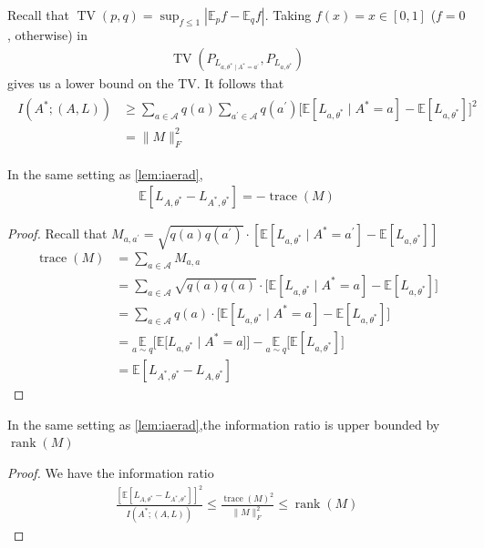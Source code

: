 \documentclass{article}
\begin{document}
Recall that $\operatorname{TV}(p, q)=\sup_{f \leq 1}\left|\mathbb{E}_{p} f-\mathbb{E}_{q} f\right| .$ Taking $f(x)=x\in[0,1]$ ($f=0$, otherwise) in
\begin{align*}
\operatorname{TV}\left(P_{L_{a, \theta^{*} \mid A^{*}=a^{\prime}}}, P_{L_{a, \theta^{*}}}\right)
\end{align*}
gives us a lower bound on the TV. It follows that
\begin{align*}
\begin{aligned}
I\left(A^{*} ;(A, L)\right) & \geq \sum_{a \in \mathcal{A}} q(a) \sum_{a^{\prime} \in \mathcal{A}} q\left(a^{\prime}\right)\bigg[\mathbb{E}\left[L_{a, \theta^{*}} \mid A^{*}=a\right]-\mathbb{E}\left[L_{a, \theta^{*}}\right]\bigg]^{2} \\
&=\|M\|_{F}^{2}
\end{aligned}
\end{align*}

\begin{lema}
  In the same setting as \cref{lem:iaerad},
\begin{align*}
\mathbb{E}\left[L_{A, \theta^{*}}-L_{A^{*}, \theta^{*}}\right]=-\operatorname{trace}(M)
\end{align*}
\end{lema}
\begin{proof}
Recall that $M_{a, a^{\prime}}=\sqrt{q(a) q\left(a^{\prime}\right)} \cdot\left[\mathbb{E}\left[L_{a, \theta^{*}} \mid A^{*}=a^{\prime}\right]-\mathbb{E}\left[L_{a, \theta^{*}}\right]\right]$
\begin{align*}
\operatorname{trace}(M) &=\sum_{a \in \mathcal{A}} M_{a, a} \\
&=\sum_{a \in \mathcal{A}} \sqrt{q(a) q(a)} \cdot\bigg[\mathbb{E}\left[L_{a, \theta^{*}} \mid A^{*}=a\right]-\mathbb{E}\left[L_{a, \theta^{*}}\right]\bigg] \\
&=\sum_{a \in \mathcal{A}} q(a) \cdot\bigg[\mathbb{E}\left[L_{a, \theta^{*}} \mid A^{*}=a\right]-\mathbb{E}\left[L_{a, \theta^{*}}\right]\bigg] \\
&=\underset{a \sim q}{\mathbb{E}}\bigg[\mathbb{E}\big[L_{a, \theta^{*}} \mid A^{*}=a\big]\bigg]-\underset{a \sim q}{\mathbb{E}}\bigg[\mathbb{E}\left[L_{a, \theta^{*}}\right]\bigg] \\
&=\mathbb{E}\left[L_{A^{*}, \theta^{*}}-L_{A, \theta^{*}}\right]
\end{align*}

\end{proof}

\begin{cora}
  In the same setting as \cref{lem:iaerad},the information ratio is upper bounded by $\operatorname{rank}(M)$
  \end{cora} 
  \begin{proof}
  We have the information ratio
\begin{align*}
\frac{\left[\mathbb{E}\left[L_{A, \theta^{*}}-L_{A^{*}, \theta^{*}}\right]\right]^{2}}{I\left(A^{*} ;(A, L)\right)} \leq \frac{\operatorname{trace}(M)^{2}}{\|M\|_{F}^{2}} \leq \operatorname{rank}(M)
\end{align*}
\end{proof}
\end{document}
